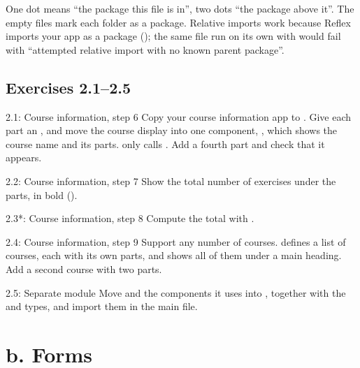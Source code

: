 One dot means ``the package this file is in'', two dots ``the package above it''. The empty  files mark each folder as a package. Relative imports work because Reflex imports your app as a package (); the same file run on its own with  would fail with ``attempted relative import with no known parent package''.

\subsection{Exercises 2.1--2.5}

\begin{exercise}{2.1: Course information, step 6}
Copy your course information app to . Give each part an , and move the course display into one component, , which shows the course name and its parts.  only calls . Add a fourth part and check that it appears.
\end{exercise}

\begin{exercise}{2.2: Course information, step 7}
Show the total number of exercises under the parts, in bold ().
\end{exercise}

\begin{exercise}{2.3*: Course information, step 8}
Compute the total with .
\end{exercise}

\begin{exercise}{2.4: Course information, step 9}
Support any number of courses.  defines a list of courses, each with its own parts, and shows all of them under a main heading. Add a second course with two parts.
\end{exercise}

\begin{exercise}{2.5: Separate module}
Move  and the components it uses into , together with the  and  types, and import them in the main file.
\end{exercise}

\section{b. Forms}

